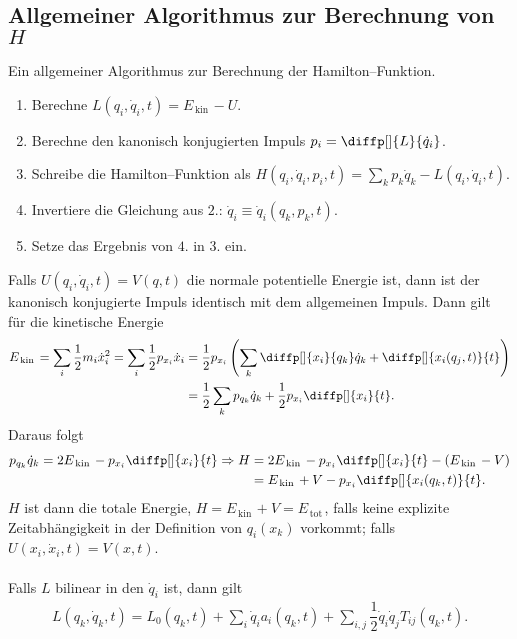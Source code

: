 \documentclass[a4paper,12pt]{article}
\numberwithin{equation}{section}
\begin{document}
\subsection{Allgemeiner Algorithmus zur Berechnung von $H$}
Ein allgemeiner Algorithmus zur Berechnung der Hamilton--Funktion.
\begin{enumerate}[label=\arabic*.]
        \item Berechne $L\left(q_i,\dot{q}_i,t\right)=E_{\,\text{kin}\,}-U$.
        \item Berechne den kanonisch konjugierten Impuls $p_i=\diffp[]{L}{\dot{q}_i}$.
        \item Schreibe die Hamilton--Funktion als $H\left(q_i,\dot{q}_i,p_i,t\right)=\sum_{k}^{}p_k\dot{q}_k-L\left(q_i,\dot{q}_i,t\right)$.
        \item Invertiere die Gleichung aus $2.$: $\dot{q}_i\equiv \dot{q}_i(q_k,p_k,t)$.
        \item Setze das Ergebnis von $4.$ in $3.$ ein.
\end{enumerate}
Falls $U(q_i,\dot{q}_i,t)=V(q,t)$ die normale potentielle Energie ist, dann ist der kanonisch konjugierte Impuls identisch mit dem allgemeinen Impuls. Dann gilt für die kinetische Energie
\begin{align*}
        E_{\,\text{kin}\,}=\sum_{i}^{}\dfrac{1}{2}m_i\dot{x}_i^2=\sum_{i}^{}\dfrac{1}{2}p_{x_i}\dot{x}_i&=\dfrac{1}{2}p_{x_i}\left(\sum_{k}^{}\diffp[]{x_i}{q_k}\dot{q}_k+\diffp[]{x_i(q_j,t)}{t}\right)\\
                                                                                  &=\dfrac{1}{2}\sum_{k}^{}p_{q_k}\dot{q}_k+\dfrac{1}{2}p_{x_i}\diffp[]{x_i}{t}
.\end{align*}
Daraus folgt
\begin{align*}
        p_{q_k}\dot{q}_k=2E_{\,\text{kin}\,}-p_{x_i}\diffp[]{x_i}{t}\Rightarrow H&=2E_{\,\text{kin}\,}-p_{x_i}\diffp[]{x_i}{t}-\left(E_{\,\text{kin}\,}-V\right)\\
                                                                                 &=E_{\,\text{kin}\,}+V-p_{x_i}\diffp[]{x_i(q_k,t)}{t}
.\end{align*}
$H$ ist dann die totale Energie, $H=E_{\,\text{kin}\,}+V=E_{\,\text{tot}\,}$, falls keine explizite Zeitabhängigkeit in der Definition von $q_i(x_k)$ vorkommt; falls $U(x_i,\dot{x}_i,t)=V(x,t)$.\\\\
Falls $L$ bilinear in den $\dot{q}_i$ ist, dann gilt
\begin{align*}
        L(q_k,\dot{q}_k,t)=L_0(q_k,t)+\sum_{i}^{}\dot{q}_ia_i(q_k,t)+\sum_{i,j}^{}\dfrac{1}{2}\dot{q}_i\dot{q}_jT_{ij}(q_k,t)
.\end{align*}
\end{document}
